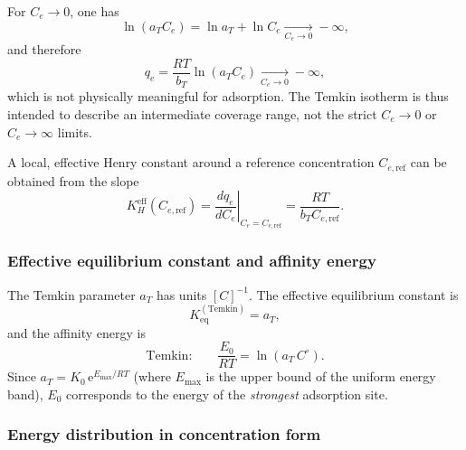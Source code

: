 	For $C_e \to 0$, one has
	\[
	\ln(a_T C_e) = \ln a_T + \ln C_e \xrightarrow[C_e \to 0]{} -\infty,
	\]
	and therefore
	\[
	q_e = \frac{RT}{b_T} \ln(a_T C_e) \xrightarrow[C_e \to 0]{} -\infty,
	\]
	which is not physically meaningful for adsorption. The Temkin isotherm is thus intended to describe an intermediate coverage range, not the strict $C_e \to 0$ or $C_e \to \infty$ limits.
	
	A local, effective Henry constant around a reference concentration $C_{e,\mathrm{ref}}$ can be obtained from the slope
	\[
	K_H^{\mathrm{eff}}(C_{e,\mathrm{ref}})
	= \left.\frac{d q_e}{d C_e}\right|_{C_e = C_{e,\mathrm{ref}}}
	= \frac{RT}{b_T C_{e,\mathrm{ref}}}.
	\]

	\subsubsection{Effective equilibrium constant and affinity energy}

	The Temkin parameter $a_T$ has units $[C]^{-1}$. The effective
	equilibrium constant is
	\begin{equation}
		K_{\mathrm{eq}}^{\mathrm{(Temkin)}} = a_T,
	\end{equation}
	and the affinity energy is
	\begin{equation}
		\text{Temkin:}\qquad
		\frac{E_0}{RT} = \ln(a_T\,C^\circ).
		\label{eq:E_temkin}
	\end{equation}
	Since $a_T = K_0\,\mathrm{e}^{E_{\max}/RT}$ (where $E_{\max}$ is the
	upper bound of the uniform energy band), $E_0$ corresponds to the
	energy of the \emph{strongest} adsorption site.

	\subsubsection{Energy distribution in concentration form}

